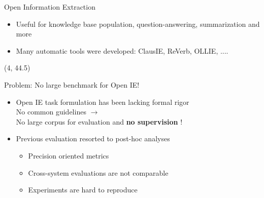 \documentclass[final]{beamer}
\newcommand{\commonvspace}[0]{\vspace{1cm}}
\begin{document}
\begin{frame}{}
\begin{textblock}{82}
\begin{block}{Open Information Extraction}
\begin{itemize}
\item Useful for knowledge base population, question-answering, summarization and more
\item Many automatic tools were developed: ClausIE, ReVerb, OLLIE, ....

  \end{itemize}

\end{block}
\end{textblock}

\begin{textblock}{39}(4, 44.5)
\begin{block}{Problem: No large benchmark for Open IE!}
  \begin{itemize}
        \setlength\itemsep{1em}
  \item Open IE task formulation has been lacking formal rigor
    \\
    No common guidelines $\rightarrow$
    \\
    No large corpus for evaluation and \textbf{no supervision} !
  \item Previous evaluation resorted to post-hoc analyses
    \begin{itemize}
          \setlength\itemsep{1em}
    \item \alert{Precision oriented} metrics
    \item Cross-system evaluations are \alert{not comparable}
    \item Experiments are \alert{hard to reproduce}
    \end{itemize}
  \end{itemize}
\end{block}

\commonvspace


\end{textblock}
\end{frame}
\end{document}
